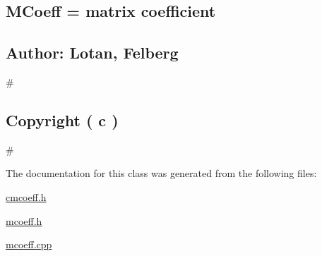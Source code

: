 \subsection*{M\-Coeff = matrix coefficient}

\subsection*{Author\-: Lotan, Felberg}

\# \subsection*{Copyright ( c )}

\# 

The documentation for this class was generated from the following files\-:\begin{DoxyCompactItemize}
\item 
\hyperlink{cmcoeff_8h}{cmcoeff.\-h}\item 
\hyperlink{mcoeff_8h}{mcoeff.\-h}\item 
\hyperlink{mcoeff_8cpp}{mcoeff.\-cpp}\end{DoxyCompactItemize}
